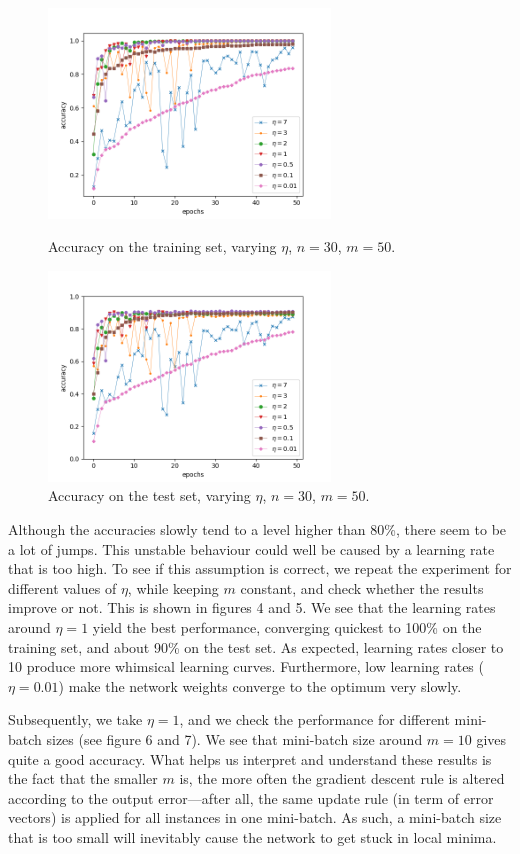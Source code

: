 \documentclass[11pt]{article}
\begin{document}
\begin{figure}[!b]
\centering
\parbox{6cm}{
\includegraphics[width=7.5cm]{delta_eta_train.png}
\caption{Accuracy on the training set, varying $\eta$, $n=30$, $m=50$.}
}
\qquad
\begin{minipage}{6cm}
\includegraphics[width=7.5cm]{delta_eta_test.png}
\caption{Accuracy on the test set, varying $\eta$, $n=30$, $m=50$.}
\end{minipage}
\end{figure}
Although the accuracies slowly tend to a level higher than 80\%, there seem to be a lot of jumps. This unstable behaviour could well be caused by a learning rate that is too high. To see if this assumption is correct, we repeat the experiment for different values of $\eta$, while keeping $m$ constant, and check whether the results improve or not. This is shown in figures 4 and 5. We see that the learning rates around $\eta=1$ yield the best performance, converging quickest to 100\% on the training set, and about 90\% on the test set. As expected, learning rates closer to 10 produce more whimsical learning curves. Furthermore, low learning rates ($\eta=0.01$) make the network weights converge to the optimum very slowly.\par
Subsequently, we take $\eta=1$, and we check the performance for different mini-batch sizes (see figure 6 and 7). We see that mini-batch size around $m=10$ gives quite a good accuracy. What helps us interpret and understand these results is the fact that the smaller $m$ is, the more often the gradient descent rule is altered according to the output error---after all, the same update rule (in term of error vectors) is applied for all instances in one mini-batch. As such, a mini-batch size that is too small will inevitably cause the network to get stuck in local minima.\par
\end{document}
